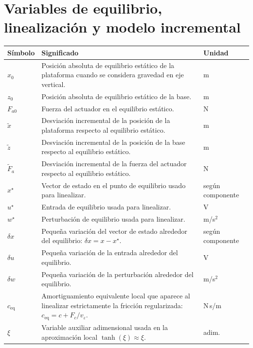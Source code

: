 \documentclass[11pt]{article}
\begin{document}
\section{Variables de equilibrio, linealizaci\'on y modelo incremental}

\begin{center}
\small
\begin{tabular}{>{\raggedright\arraybackslash}p{3.0cm} >{\raggedright\arraybackslash}p{9.0cm} >{\raggedright\arraybackslash}p{2.2cm}}
\toprule
\textbf{S\'imbolo} & \textbf{Significado} & \textbf{Unidad} \\
\midrule
$x_0$ & Posici\'on absoluta de equilibrio est\'atico de la plataforma cuando se considera gravedad en eje vertical. & m \\
$z_0$ & Posici\'on absoluta de equilibrio est\'atico de la base. & m \\
$F_{a0}$ & Fuerza del actuador en el equilibrio est\'atico. & N \\
$\tilde x$ & Desviaci\'on incremental de la posici\'on de la plataforma respecto al equilibrio est\'atico. & m \\
$\tilde z$ & Desviaci\'on incremental de la posici\'on de la base respecto al equilibrio est\'atico. & m \\
$\tilde F_a$ & Desviaci\'on incremental de la fuerza del actuador respecto al equilibrio est\'atico. & N \\
$x^\star$ & Vector de estado en el punto de equilibrio usado para linealizar. & seg\'un componente \\
$u^\star$ & Entrada de equilibrio usada para linealizar. & V \\
$w^\star$ & Perturbaci\'on de equilibrio usada para linealizar. & m/s$^2$ \\
$\delta x$ & Peque\~na variaci\'on del vector de estado alrededor del equilibrio: $\delta x=x-x^\star$. & seg\'un componente \\
$\delta u$ & Peque\~na variaci\'on de la entrada alrededor del equilibrio. & V \\
$\delta w$ & Peque\~na variaci\'on de la perturbaci\'on alrededor del equilibrio. & m/s$^2$ \\
$c_{\text{eq}}$ & Amortiguamiento equivalente local que aparece al linealizar estrictamente la fricci\'on regularizada: $c_{\text{eq}}=c+F_c/v_\varepsilon$. & N\,s/m \\
$\xi$ & Variable auxiliar adimensional usada en la aproximaci\'on local $\tanh(\xi)\approx \xi$. & adim. \\
\bottomrule
\end{tabular}
\end{center}
\end{document}
